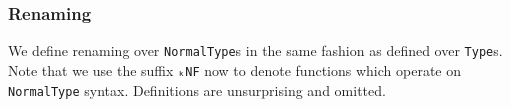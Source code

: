\documentclass[authoryear, acmsmall, screen, review, nonacm]{acmart}
\begin{document}
\begin{code}
\<%
\\
%
\>[4]\AgdaSpace{}%
\AgdaSpace{}%
\<%
\\
%
\\[\AgdaEmptyExtraSkip]%
%
\>[2]%
\>[6]\AgdaSymbol{:}\<%
\\
\>[2][@{}l@{\AgdaIndent{0}}]%
\>[4]\AgdaSymbol{(}\AgdaSpace{}%
\AgdaSymbol{:}\AgdaSpace{}%
\AgdaSpace{}%
\AgdaSpace{}%
\AgdaOperator{\AgdaInductiveConstructor{R[}}\AgdaSpace{}%
\AgdaSpace{}%
\AgdaOperator{\AgdaInductiveConstructor{]}}\AgdaSymbol{)}\AgdaSpace{}%
\<%
\\
%
\>[4]\AgdaSpace{}%
\AgdaSpace{}%
\<%
\end{code}

\subsubsection{Renaming}
We define renaming over \verb!NormalType!s in the same fashion as defined over \verb!Type!s. Note that we use the suffix \verb!ₖNF! now to denote functions which operate on \verb!NormalType! syntax. Definitions are unsurprising and omitted.
\end{document}
